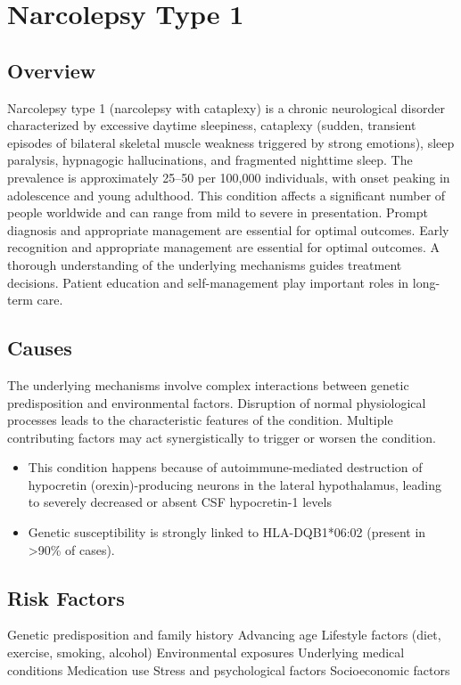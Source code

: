 \chapter{Narcolepsy Type 1}
\label{sec:Narcolepsy Type 1}

\section{Overview}
Narcolepsy type 1 (narcolepsy with cataplexy) is a chronic neurological disorder characterized by excessive daytime sleepiness, cataplexy (sudden, transient episodes of bilateral skeletal muscle weakness triggered by strong emotions), sleep paralysis, hypnagogic hallucinations, and fragmented nighttime sleep. The prevalence is approximately 25--50 per 100,000 individuals, with onset peaking in adolescence and young adulthood. This condition affects a significant number of people worldwide and can range from mild to severe in presentation. Prompt diagnosis and appropriate management are essential for optimal outcomes. Early recognition and appropriate management are essential for optimal outcomes. A thorough understanding of the underlying mechanisms guides treatment decisions. Patient education and self-management play important roles in long-term care.
\section{Causes}
The underlying mechanisms involve complex interactions between genetic predisposition and environmental factors. Disruption of normal physiological processes leads to the characteristic features of the condition. Multiple contributing factors may act synergistically to trigger or worsen the condition.

\begin{itemize}[noitemsep]
  \item This condition happens because of autoimmune-mediated destruction of hypocretin (orexin)-producing neurons in the lateral hypothalamus, leading to severely decreased or absent CSF hypocretin-1 levels
  \item Genetic susceptibility is strongly linked to HLA-DQB1*06:02 (present in >90\% of cases).
\end{itemize}
\section{Risk Factors}
Genetic predisposition and family history Advancing age Lifestyle factors (diet, exercise, smoking, alcohol) Environmental exposures Underlying medical conditions Medication use Stress and psychological factors Socioeconomic factors

